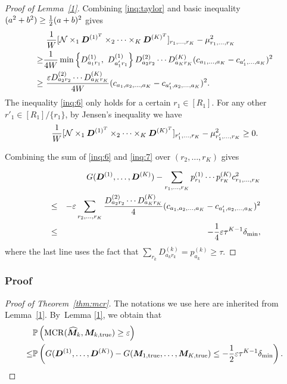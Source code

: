 \documentclass{article}
\DeclareMathOperator*{\mcr}{MCR}
\begin{document}
\begin{appendices}
\begin{proof}[Proof of Lemma~\ref{1}]
Combining \eqref{inq:taylor} and  basic inequality $(a^2+b^2)\geq {1\over 2}(a+b)^2$ gives
\begin{align}\label{inq:6}
&\ {1\over W}[\mathcal{N}\times_1\bm{D}^{(1)^T}\times_2\cdots \times_K\bm{D}^{(K)^T}]_{r_1,\ldots,r_K}-\mu_{r_1,\ldots,r_K}^2\notag \\
   \geq & \frac{1}{4W}\min\left\{D_{a_1r_1}^{(1)},\ D_{a_1'r_1}^{(1)}\right\}D_{a_2r_2}^{(2)}\cdots D_{a_Kr_K}^{(K)}(c_{a_1,\ldots,a_K}-c_{a_1',\ldots,a_K})^2\notag \\
   \geq &\ \frac{\varepsilon D_{a_2r_2}^{(2)}\cdots D_{a_Kr_K}^{(K)}}{4W}(c_{a_1,a_2,\ldots,a_K}-c_{a_1',a_2,\ldots,a_K})^2.
\end{align}
The inequality \eqref{inq:6} only holds for a certain $r_1\in[R_1]$. For any other $r'_1\in [R_1]/\{r_1\}$, by Jensen's inequality we have
\begin{equation} 
    \frac{1}{W}[\mathcal{N}\times_1\bm{D}^{(1)^T}\times_2\cdots \times_K\bm{D}^{(K)^T}]_{r'_1,\ldots,r_K}-\mu^2_{r'_1,\ldots,r_K} \geq 0.
    \label{inq:7}
\end{equation}


Combining the sum of \eqref{inq:6} and \eqref{inq:7} over $(r_2,\ldots,r_K)$ gives

\begin{eqnarray*}
&& G(\bm{D}^{(1)},\ldots,\bm{D}^{(K)})-\sum_{r_1,\ldots,r_K} p^{(1)}_{r_1} \cdots p^{(K)}_{r_K} c^2_{r_1,\ldots,r_K}    \\
&\leq& -\varepsilon\displaystyle\sum_{r_2,\ldots,r_K}\frac{D_{a_2r_2}^{(2)}\cdots D_{a_Kr_K}^{(K)}}{4}(c_{a_1,a_2,\ldots,a_K}-c_{a_1',a_2,\ldots,a_K})^2\\
&\leq& -\frac{1}{4}\varepsilon\tau^{K-1}\delta_{\min},
\end{eqnarray*}
where the last line uses the fact that $\displaystyle\sum_{r_k}D_{a_kr_k}^{(k)}=p_{a_k}^{(k)}\geq \tau$. 
\end{proof}

\subsubsection{Proof}
\begin{proof}[Proof of Theorem~\ref{thm:mcr}]
The notations we use here are inherited from Lemma~\ref{1}. By~Lemma \ref{1}, we obtain that
\begin{align}\label{inq:1}
   &\mathbb{P}\left(\mcr(\widehat{\mM}_k, \mM_{k,\text{true}})\geq \varepsilon\right)\notag \\
\leq & \mathbb{P}\left(G(\mD^{(1)},\ldots,\mD^{(K)})-G(\mM_{1,\text{true}},\ldots,\mM_{K,\text{true}})\leq -\frac{1}{2}\varepsilon\tau^{K-1}\delta_{\min}\right).
\end{align}



\end{proof}
\end{appendices}
\end{document}
